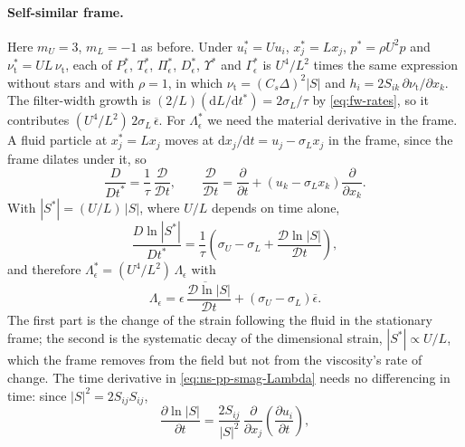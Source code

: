 \documentclass{article}
\begin{document}
\paragraph{Self-similar frame.}
Here $m_U = 3$, $m_L = -1$ as before. Under $u_i^* = U u_i$,
$x_j^* = L x_j$, $p^* = \rho U^2 p$ and
$\nu_{\mathrm{t}}^* = UL\, \nu_{\mathrm{t}}$, each of $P_\epsilon^*$,
$T_\epsilon^*$, $\Pi_\epsilon^*$, $D_\epsilon^*$, $\Upsilon^*$ and
$\Gamma_\epsilon^*$ is $U^4/L^2$ times the same expression without stars and
with $\rho = 1$, in which $\nu_{\mathrm{t}} = (C_s\Delta)^2 |S|$ and
$h_i = 2 S_{ik}\, \partial \nu_{\mathrm{t}} / \partial x_k$. The filter-width
growth is $(2/L)(\mathrm{d}L/\mathrm{d}t^*) = 2\sigma_L / \tau$ by
\eqref{eq:fw-rates}, so it contributes $(U^4/L^2)\, 2\sigma_L\, \overline{\epsilon}$.
For $\Lambda_\epsilon^*$ we need the material derivative in the frame. A
fluid particle at $x_j^* = L x_j$ moves at
$\mathrm{d}x_j / \mathrm{d}t = u_j - \sigma_L x_j$ in the frame, since the
frame dilates under it, so
\begin{equation}\label{eq:ns-pp-smag-frame-material}
  \frac{D}{D t^*} = \frac{1}{\tau}\, \frac{\mathcal{D}}{\mathcal{D} t} ,
  \qquad
  \frac{\mathcal{D}}{\mathcal{D} t}
  = \frac{\partial}{\partial t} + \left( u_k - \sigma_L x_k \right) \frac{\partial}{\partial x_k} .
\end{equation}
With $|S^*| = (U/L)\, |S|$, where $U/L$ depends on time alone,
\begin{equation*}
  \frac{D \ln |S^*|}{D t^*}
  = \frac{1}{\tau}\left( \sigma_U - \sigma_L + \frac{\mathcal{D} \ln |S|}{\mathcal{D} t} \right) ,
\end{equation*}
and therefore $\Lambda_\epsilon^* = (U^4/L^2)\, \Lambda_\epsilon$ with
\begin{equation}\label{eq:ns-pp-smag-Lambda}
  \Lambda_\epsilon
  = \overline{\epsilon\, \frac{\mathcal{D} \ln |S|}{\mathcal{D} t}}
  + \left( \sigma_U - \sigma_L \right) \overline{\epsilon} .
\end{equation}
The first part is the change of the strain following the fluid in the
stationary frame; the second is the systematic decay of the dimensional
strain, $|S^*| \propto U/L$, which the frame removes from the field but not
from the viscosity's rate of change. The time derivative in
\eqref{eq:ns-pp-smag-Lambda} needs no differencing in time: since
$|S|^2 = 2 S_{ij} S_{ij}$,
\begin{equation}\label{eq:ns-pp-smag-dS-dt}
  \frac{\partial \ln |S|}{\partial t}
  = \frac{2 S_{ij}}{|S|^2}\, \frac{\partial}{\partial x_j}\! \left( \frac{\partial u_i}{\partial t} \right) ,
\end{equation}
\end{document}
